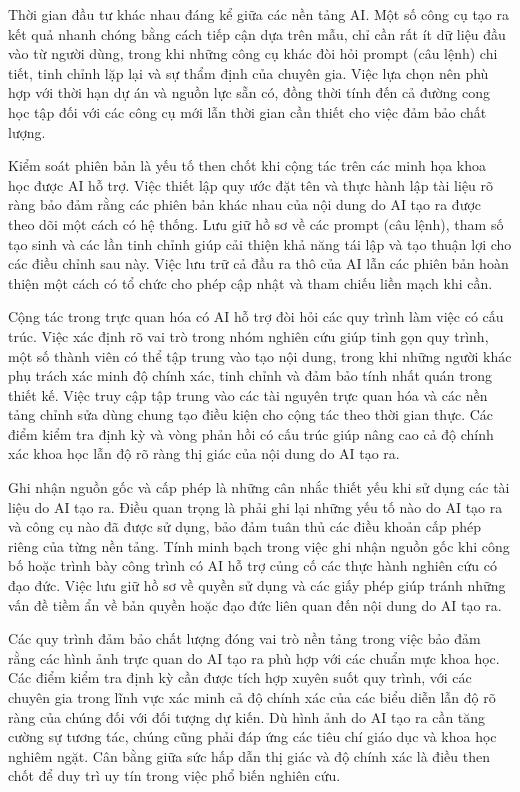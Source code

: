 Thời gian đầu tư khác nhau đáng kể giữa các nền tảng AI. Một số công cụ tạo ra kết quả nhanh chóng bằng cách tiếp cận dựa trên mẫu, chỉ cần rất ít dữ liệu đầu vào từ người dùng, trong khi những công cụ khác đòi hỏi prompt (câu lệnh) chi tiết, tinh chỉnh lặp lại và sự thẩm định của chuyên gia. Việc lựa chọn nên phù hợp với thời hạn dự án và nguồn lực sẵn có, đồng thời tính đến cả đường cong học tập đối với các công cụ mới lẫn thời gian cần thiết cho việc đảm bảo chất lượng.

Kiểm soát phiên bản là yếu tố then chốt khi cộng tác trên các minh họa khoa học được AI hỗ trợ. Việc thiết lập quy ước đặt tên và thực hành lập tài liệu rõ ràng bảo đảm rằng các phiên bản khác nhau của nội dung do AI tạo ra được theo dõi một cách có hệ thống. Lưu giữ hồ sơ về các prompt (câu lệnh), tham số tạo sinh và các lần tinh chỉnh giúp cải thiện khả năng tái lập và tạo thuận lợi cho các điều chỉnh sau này. Việc lưu trữ cả đầu ra thô của AI lẫn các phiên bản hoàn thiện một cách có tổ chức cho phép cập nhật và tham chiếu liền mạch khi cần.

Cộng tác trong trực quan hóa có AI hỗ trợ đòi hỏi các quy trình làm việc có cấu trúc. Việc xác định rõ vai trò trong nhóm nghiên cứu giúp tinh gọn quy trình, một số thành viên có thể tập trung vào tạo nội dung, trong khi những người khác phụ trách xác minh độ chính xác, tinh chỉnh và đảm bảo tính nhất quán trong thiết kế. Việc truy cập tập trung vào các tài nguyên trực quan hóa và các nền tảng chỉnh sửa dùng chung tạo điều kiện cho cộng tác theo thời gian thực. Các điểm kiểm tra định kỳ và vòng phản hồi có cấu trúc giúp nâng cao cả độ chính xác khoa học lẫn độ rõ ràng thị giác của nội dung do AI tạo ra.

Ghi nhận nguồn gốc và cấp phép là những cân nhắc thiết yếu khi sử dụng các tài liệu do AI tạo ra. Điều quan trọng là phải ghi lại những yếu tố nào do AI tạo ra và công cụ nào đã được sử dụng, bảo đảm tuân thủ các điều khoản cấp phép riêng của từng nền tảng. Tính minh bạch trong việc ghi nhận nguồn gốc khi công bố hoặc trình bày công trình có AI hỗ trợ củng cố các thực hành nghiên cứu có đạo đức. Việc lưu giữ hồ sơ về quyền sử dụng và các giấy phép giúp tránh những vấn đề tiềm ẩn về bản quyền hoặc đạo đức liên quan đến nội dung do AI tạo ra.

Các quy trình đảm bảo chất lượng đóng vai trò nền tảng trong việc bảo đảm rằng các hình ảnh trực quan do AI tạo ra phù hợp với các chuẩn mực khoa học. Các điểm kiểm tra định kỳ cần được tích hợp xuyên suốt quy trình, với các chuyên gia trong lĩnh vực xác minh cả độ chính xác của các biểu diễn lẫn độ rõ ràng của chúng đối với đối tượng dự kiến. Dù hình ảnh do AI tạo ra cần tăng cường sự tương tác, chúng cũng phải đáp ứng các tiêu chí giáo dục và khoa học nghiêm ngặt. Cân bằng giữa sức hấp dẫn thị giác và độ chính xác là điều then chốt để duy trì uy tín trong việc phổ biến nghiên cứu.

